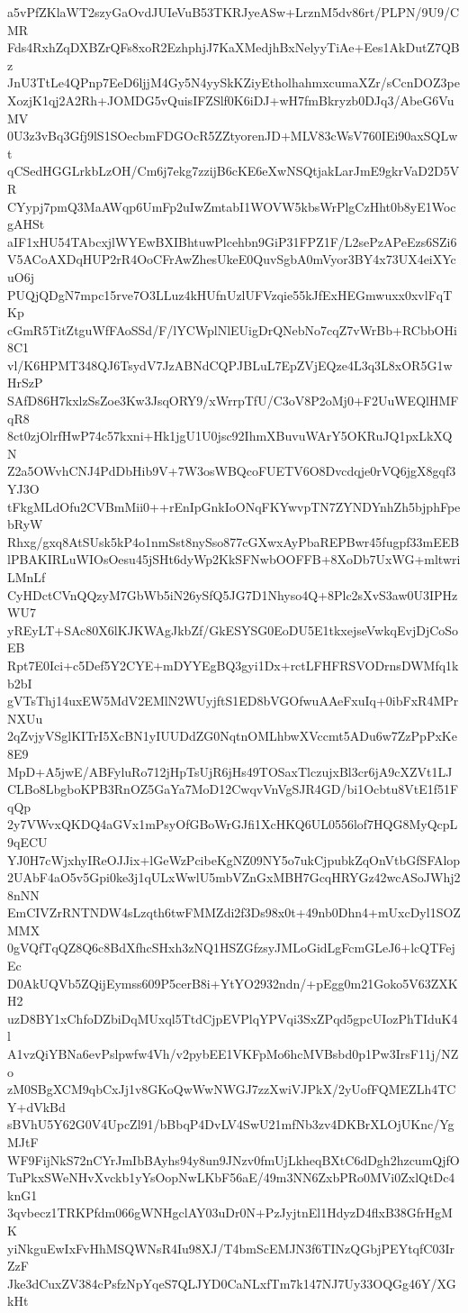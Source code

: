 a5vPfZKlaWT2szyGaOvdJUIeVuB53TKRJyeASw+LrznM5dv86rt/PLPN/9U9/CMR
Fds4RxhZqDXBZrQFs8xoR2EzhphjJ7KaXMedjhBxNelyyTiAe+Ees1AkDutZ7QBz
JnU3TtLe4QPnp7EeD6ljjM4Gy5N4yySkKZiyEtholhahmxcumaXZr/sCcnDOZ3pe
XozjK1qj2A2Rh+JOMDG5vQuisIFZSlf0K6iDJ+wH7fmBkryzb0DJq3/AbeG6VuMV
0U3z3vBq3Gfj9lS1SOecbmFDGOcR5ZZtyorenJD+MLV83cWsV760IEi90axSQLwt
qCSedHGGLrkbLzOH/Cm6j7ekg7zzijB6cKE6eXwNSQtjakLarJmE9gkrVaD2D5VR
CYypj7pmQ3MaAWqp6UmFp2uIwZmtabI1WOVW5kbsWrPlgCzHht0b8yE1WocgAHSt
aIF1xHU54TAbcxjlWYEwBXIBhtuwPlcehbn9GiP31FPZ1F/L2sePzAPeEzs6SZi6
V5ACoAXDqHUP2rR4OoCFrAwZhesUkeE0QuvSgbA0mVyor3BY4x73UX4eiXYcuO6j
PUQjQDgN7mpc15rve7O3LLuz4kHUfnUzlUFVzqie55kJfExHEGmwuxx0xvlFqTKp
cGmR5TitZtguWfFAoSSd/F/lYCWplNlEUigDrQNebNo7cqZ7vWrBb+RCbbOHi8C1
vl/K6HPMT348QJ6TsydV7JzABNdCQPJBLuL7EpZVjEQze4L3q3L8xOR5G1wHrSzP
SAfD86H7kxlzSsZoe3Kw3JsqORY9/xWrrpTfU/C3oV8P2oMj0+F2UuWEQlHMFqR8
8ct0zjOlrfHwP74c57kxni+Hk1jgU1U0jsc92IhmXBuvuWArY5OKRuJQ1pxLkXQN
Z2a5OWvhCNJ4PdDbHib9V+7W3osWBQcoFUETV6O8Dvcdqje0rVQ6jgX8gqf3YJ3O
tFkgMLdOfu2CVBmMii0++rEnIpGnkIoONqFKYwvpTN7ZYNDYnhZh5bjphFpebRyW
Rhxg/gxq8AtSUsk5kP4o1nmSst8nySso877cGXwxAyPbaREPBwr45fugpf33mEEB
lPBAKIRLuWIOsOesu45jSHt6dyWp2KkSFNwbOOFFB+8XoDb7UxWG+mltwriLMnLf
CyHDctCVnQQzyM7GbWb5iN26ySfQ5JG7D1Nhyso4Q+8Plc2sXvS3aw0U3IPHzWU7
yREyLT+SAc80X6lKJKWAgJkbZf/GkESYSG0EoDU5E1tkxejseVwkqEvjDjCoSoEB
Rpt7E0Ici+c5Def5Y2CYE+mDYYEgBQ3gyi1Dx+rctLFHFRSVODrnsDWMfq1kb2bI
gVTsThj14uxEW5MdV2EMlN2WUyjftS1ED8bVGOfwuAAeFxuIq+0ibFxR4MPrNXUu
2qZvjyVSglKITrI5XcBN1yIUUDdZG0NqtnOMLhbwXVccmt5ADu6w7ZzPpPxKe8E9
MpD+A5jwE/ABFyluRo712jHpTsUjR6jHs49TOSaxTlczujxBl3cr6jA9cXZVt1LJ
CLBo8LbgboKPB3RnOZ5GaYa7MoD12CwqvVnVgSJR4GD/bi1Ocbtu8VtE1f51FqQp
2y7VWvxQKDQ4aGVx1mPsyOfGBoWrGJfi1XcHKQ6UL0556lof7HQG8MyQcpL9qECU
YJ0H7cWjxhyIReOJJix+lGeWzPcibeKgNZ09NY5o7ukCjpubkZqOnVtbGfSFAlop
2UAbF4aO5v5Gpi0ke3j1qULxWwlU5mbVZnGxMBH7GcqHRYGz42wcASoJWhj28nNN
EmCIVZrRNTNDW4sLzqth6twFMMZdi2f3Ds98x0t+49nb0Dhn4+mUxcDyl1SOZMMX
0gVQfTqQZ8Q6c8BdXfhcSHxh3zNQ1HSZGfzsyJMLoGidLgFcmGLeJ6+lcQTFejEc
D0AkUQVb5ZQijEymss609P5cerB8i+YtYO2932ndn/+pEgg0m21Goko5V63ZXKH2
uzD8BY1xChfoDZbiDqMUxql5TtdCjpEVPlqYPVqi3SxZPqd5gpcUIozPhTIduK4l
A1vzQiYBNa6evPslpwfw4Vh/v2pybEE1VKFpMo6hcMVBsbd0p1Pw3IrsF11j/NZo
zM0SBgXCM9qbCxJj1v8GKoQwWwNWGJ7zzXwiVJPkX/2yUofFQMEZLh4TCY+dVkBd
sBVhU5Y62G0V4UpcZl91/bBbqP4DvLV4SwU21mfNb3zv4DKBrXLOjUKnc/YgMJtF
WF9FijNkS72nCYrJmIbBAyhs94y8un9JNzv0fmUjLkheqBXtC6dDgh2hzcumQjfO
TuPkxSWeNHvXvckb1yYsOopNwLKbF56aE/49m3NN6ZxbPRo0MVi0ZxlQtDc4knG1
3qvbecz1TRKPfdm066gWNHgclAY03uDr0N+PzJyjtnEl1HdyzD4flxB38GfrHgMK
yiNkguEwIxFvHhMSQWNsR4Iu98XJ/T4bmScEMJN3f6TINzQGbjPEYtqfC03IrZzF
Jke3dCuxZV384cPsfzNpYqeS7QLJYD0CaNLxfTm7k147NJ7Uy33OQGg46Y/XGkHt

